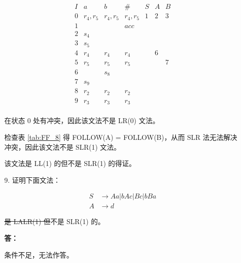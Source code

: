 \begin{enumerate}
    \begin{equation*}
        \begin{array}{c|ccc|ccc}
            I & a & b & \# & S & A & B \\
            \hline
            0 & r_4, r_5 & r_4, r_5 & r_4, r_5 & 1 & 2 & 3 \\
            1 & & & acc & & & \\
            2 & s_4 & & & & & \\
            3 & s_5 & & & & & \\
            4 & r_4 & r_4 & r_4 & & 6 & \\
            5 & r_5 & r_5 & r_5 & & & 7 \\
            6 & & s_8 & & & & \\
            7 & s_9 & & & & & \\
            8 & r_2 & r_2 & r_2 & & & \\
            9 & r_3 & r_3 & r_3 & & & \\
        \end{array}
    \end{equation*}
    
    在状态 0 处有冲突，因此该文法不是 LR(0) 文法。
    
    检查表 \ref{tab:FF_8} 得 FOLLOW(A) = FOLLOW(B)，从而 SLR 法无法解决冲突，因此该文法不是 SLR(1) 文法。
    
    该文法是 LL(1) 的但不是 SLR(1) 的得证。
    
    \item[9.] 证明下面文法：
    
    \begin{align*}
        S & \to Aa | bAc | Bc | bBa \\
        A & \to d
    \end{align*}
    
    \sout{是 LALR(1) 但}不是 SLR(1) 的。
    
    \textbf{答：}
    
    条件不足，无法作答。
    
\end{enumerate}